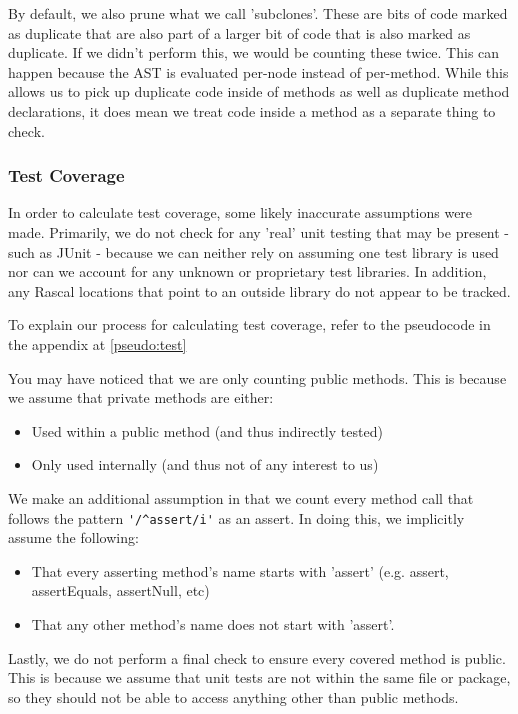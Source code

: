 \documentclass{article}
\begin{document}
By default, we also prune what we call 'subclones'. These are bits of code marked as duplicate that are also part of a larger bit of code that is also marked as duplicate. If we didn't perform this, we would be counting these twice. This can happen because the AST is evaluated per-node instead of per-method. While this allows us to pick up duplicate code inside of methods as well as duplicate method declarations, it does mean we treat code inside a method as a separate thing to check.

\subsubsection{Test Coverage} \label{assumetests}
In order to calculate test coverage, some likely inaccurate assumptions were made.
Primarily, we do not check for any 'real' unit testing that may be present - such as JUnit - because we can neither rely on assuming one test library is used nor can we account for any unknown or proprietary test libraries. In addition, any Rascal locations that point to an outside library do not appear to be tracked.

To explain our process for calculating test coverage, refer to the pseudocode in the appendix at \ref{pseudo:test}

You may have noticed that we are only counting public methods. This is because we assume that private methods are either:

\begin{itemize}
\item Used within a public method (and thus indirectly tested)
\item Only used internally (and thus not of any interest to us)
\end{itemize}

We make an additional assumption in that we count every method call that follows the pattern \verb|'/^assert/i'| as an assert. In doing this, we implicitly assume the following:
\begin{itemize}
\item That every asserting method's name starts with 'assert' (e.g. assert, assertEquals, assertNull, etc)
\item That any other method's name does not start with 'assert'.
\end{itemize}

Lastly, we do not perform a final check to ensure every covered method is public. This is because we assume that unit tests are not within the same file or package, so they should not be able to access anything other than public methods.
\end{document}
